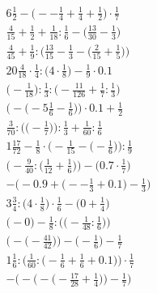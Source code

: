 \documentclass[8pt]{article}
\begin{document}
\begin{align}
6\frac{1}{2} - \big(--\frac{1}{4} + \frac{1}{4} + \frac{1}{2}\big) \cdot \frac{1}{7} \\
\frac{4}{15} + \frac{1}{2} + \frac{1}{18} : \frac{1}{6} - \big(\frac{13}{30} - \frac{1}{3}\big) \\
\frac{4}{45} + \frac{1}{9} : \Big(\frac{13}{15} - \frac{1}{3} - \big(\frac{2}{15} + \frac{1}{5}\big)\Big) \\
20\frac{4}{18} \cdot \frac{1}{4} : \big(4 \cdot \frac{1}{8}\big) - \frac{1}{9} \cdot 0.1 \\
\big(-\frac{1}{18}\big) : \frac{1}{3} : \big(-\frac{11}{126} + \frac{1}{7} : \frac{1}{3}\big) \\
\Big(-\big(-5\frac{1}{6} - \frac{1}{6}\big)\Big) \cdot 0.1 + \frac{1}{2} \\
\frac{3}{70} : \Big(\big(-\frac{1}{7}\big)\Big) : \frac{1}{3} + \frac{1}{60} : \frac{1}{6} \\
1\frac{17}{72} - \frac{1}{8} \cdot \Big(-\frac{1}{15} - \big(-\frac{1}{6}\big)\Big) : \frac{1}{9} \\
\Big(-\frac{9}{40} : \big(\frac{1}{12} + \frac{1}{6}\big)\Big) - \Big(0.7 \cdot \frac{1}{7}\Big) \\
-\Big(-0.9 + \big(--\frac{1}{3} + 0.1\big) - \frac{1}{3}\Big) \\
3\frac{3}{4} : \big(4 \cdot \frac{1}{8}\big) \cdot \frac{1}{6} - \big(0 + \frac{1}{4}\big) \\
\Big(-0\Big) - \frac{1}{8} : \Big(\big(-\frac{1}{48} : \frac{1}{6}\big)\Big) \\
\Big(-\big(-\frac{41}{42}\big)\Big) - \Big(-\frac{1}{6}\Big) - \frac{1}{7} \\
1\frac{1}{6} : \Big(\frac{1}{60} : \big(-\frac{1}{6} + \frac{1}{6} + 0.1\big)\Big) \cdot \frac{1}{7} \\
-\bigg(-\Big(-\big(-\frac{17}{28} + \frac{1}{4}\big)\Big) - \frac{1}{7}\bigg)
\end{align}
\end{document}
